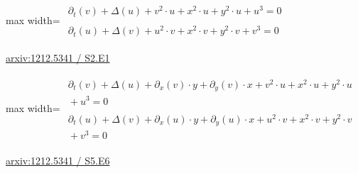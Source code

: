 \documentclass[10pt,a4paper]{article}
\begin{document}
\begin{minipage}{\linewidth}
\begin{center}\begin{adjustbox}{max width=\linewidth}$\displaystyle\begin{gathered}\begin{gathered}\partial_{t}(v)+\Delta(u)+v^{2}\cdot u+x^{2}\cdot u+y^{2}\cdot u+u^{3}=0\end{gathered}\\[5pt]\begin{gathered}\partial_{t}(u)+\Delta(v)+u^{2}\cdot v+x^{2}\cdot v+y^{2}\cdot v+v^{3}=0\end{gathered}\end{gathered}$\end{adjustbox}\end{center}
{\small \href{https://arxiv.org/html/1212.5341#S2.E1}{arxiv:1212.5341 / S2.E1}}\par
\end{minipage}\par\vspace{7mm}

\begin{minipage}{\linewidth}
\begin{center}\begin{adjustbox}{max width=\linewidth}$\displaystyle\begin{gathered}\begin{gathered}\partial_{t}(v)+\Delta(u)+\partial_{x}(v)\cdot y+\partial_{y}(v)\cdot x+v^{2}\cdot u+x^{2}\cdot u+y^{2}\cdot u\\[-1pt]{}+u^{3}=0\end{gathered}\\[5pt]\begin{gathered}\partial_{t}(u)+\Delta(v)+\partial_{x}(u)\cdot y+\partial_{y}(u)\cdot x+u^{2}\cdot v+x^{2}\cdot v+y^{2}\cdot v\\[-1pt]{}+v^{3}=0\end{gathered}\end{gathered}$\end{adjustbox}\end{center}
{\small \href{https://arxiv.org/html/1212.5341#S5.E6}{arxiv:1212.5341 / S5.E6}}\par
\end{minipage}\par\vspace{7mm}
\end{document}
